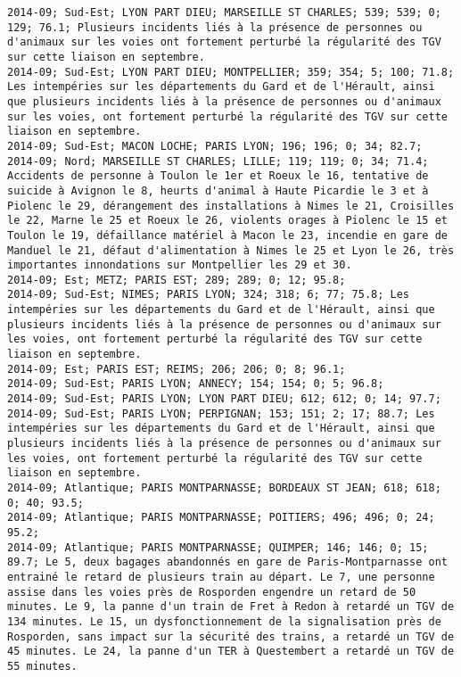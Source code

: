 \documentclass{article}
\begin{document}
\begin{Verbatim}[commandchars=\\\{\}]
2014-09; Sud-Est; LYON PART DIEU; MARSEILLE ST CHARLES; 539; 539; 0; 129; 76.1; Plusieurs incidents liés à la présence de personnes ou d'animaux sur les voies ont fortement perturbé la régularité des TGV sur cette liaison en septembre.
2014-09; Sud-Est; LYON PART DIEU; MONTPELLIER; 359; 354; 5; 100; 71.8; Les intempéries sur les départements du Gard et de l'Hérault, ainsi que plusieurs incidents liés à la présence de personnes ou d'animaux sur les voies, ont fortement perturbé la régularité des TGV sur cette liaison en septembre.
2014-09; Sud-Est; MACON LOCHE; PARIS LYON; 196; 196; 0; 34; 82.7; 
2014-09; Nord; MARSEILLE ST CHARLES; LILLE; 119; 119; 0; 34; 71.4; Accidents de personne à Toulon le 1er et Roeux le 16, tentative de suicide à Avignon le 8, heurts d'animal à Haute Picardie le 3 et à Piolenc le 29, dérangement des installations à Nimes le 21, Croisilles le 22, Marne le 25 et Roeux le 26, violents orages à Piolenc le 15 et Toulon le 19, défaillance matériel à Macon le 23, incendie en gare de Manduel le 21, défaut d'alimentation à Nimes le 25 et Lyon le 26, très importantes innondations sur Montpellier les 29 et 30.
2014-09; Est; METZ; PARIS EST; 289; 289; 0; 12; 95.8; 
2014-09; Sud-Est; NIMES; PARIS LYON; 324; 318; 6; 77; 75.8; Les intempéries sur les départements du Gard et de l'Hérault, ainsi que plusieurs incidents liés à la présence de personnes ou d'animaux sur les voies, ont fortement perturbé la régularité des TGV sur cette liaison en septembre.
2014-09; Est; PARIS EST; REIMS; 206; 206; 0; 8; 96.1; 
2014-09; Sud-Est; PARIS LYON; ANNECY; 154; 154; 0; 5; 96.8; 
2014-09; Sud-Est; PARIS LYON; LYON PART DIEU; 612; 612; 0; 14; 97.7; 
2014-09; Sud-Est; PARIS LYON; PERPIGNAN; 153; 151; 2; 17; 88.7; Les intempéries sur les départements du Gard et de l'Hérault, ainsi que plusieurs incidents liés à la présence de personnes ou d'animaux sur les voies, ont fortement perturbé la régularité des TGV sur cette liaison en septembre.
2014-09; Atlantique; PARIS MONTPARNASSE; BORDEAUX ST JEAN; 618; 618; 0; 40; 93.5; 
2014-09; Atlantique; PARIS MONTPARNASSE; POITIERS; 496; 496; 0; 24; 95.2; 
2014-09; Atlantique; PARIS MONTPARNASSE; QUIMPER; 146; 146; 0; 15; 89.7; Le 5, deux bagages abandonnés en gare de Paris-Montparnasse ont entrainé le retard de plusieurs train au départ. Le 7, une personne assise dans les voies près de Rosporden engendre un retard de 50 minutes. Le 9, la panne d'un train de Fret à Redon à retardé un TGV de 134 minutes. Le 15, un dysfonctionnement de la signalisation près de Rosporden, sans impact sur la sécurité des trains, a retardé un TGV de 45 minutes. Le 24, la panne d'un TER à Questembert a retardé un TGV de 55 minutes. 

\end{Verbatim}
\end{document}
